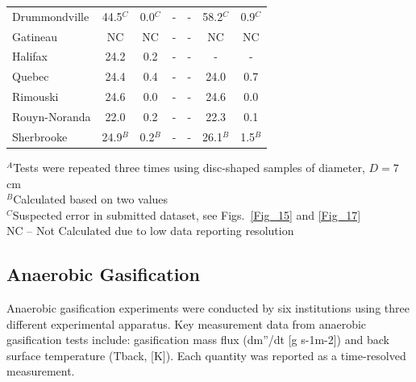 \documentclass{book}
\begin{document}
\begin{table}[ht]
\begin{center}
\begin{tabular}{|l|cc|cc|cc|}
Drummondville                           & 44.5$^C$ & 0.0$^C$                & -                     & -                      & 58.2$^C$              & 0.9$^C$                   \\
Gatineau                                & NC       & NC                     & -                     & -                      & NC                    & NC                        \\
Halifax                                 & 24.2     & 0.2                    & -                     & -                      & -                     & -                         \\
Quebec                                  & 24.4     & 0.4                    & -                     & -                      & 24.0                  & 0.7                       \\
Rimouski                                & 24.6     & 0.0                    & -                     & -                      & 24.6                  & 0.0                       \\
Rouyn-Noranda                           & 22.0     & 0.2                    & -                     & -                      & 22.3                  & 0.1                       \\
Sherbrooke                              & 24.9$^B$ & 0.2$^B$                & -                     & -                      & 26.1$^B$              & 1.5$^B$                   \\ \hline
\end{tabular}
\end{center}
$^A$Tests were repeated three times using disc-shaped samples of diameter, $D = 7$ cm \\
$^B$Calculated based on two values \\
$^C$Suspected error in submitted dataset, see Figs.~\ref{Fig_15} and \ref{Fig_17} \\
NC – Not Calculated due to low data reporting resolution
\end{table}



\subsection{Anaerobic Gasification}

Anaerobic gasification experiments were conducted by six institutions using three different experimental apparatus. Key measurement data from anaerobic gasification tests include: gasification mass flux (dm”/dt [g s-1m-2]) and back surface temperature (Tback, [K]). Each quantity was reported as a time-resolved measurement.
\end{document}
